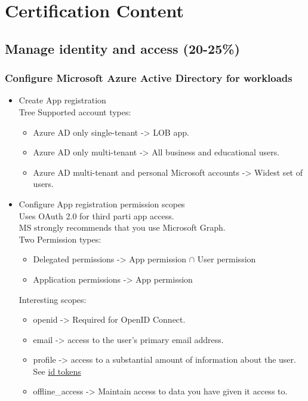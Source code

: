 \section{Certification Content}

\subsection{Manage identity and access (20-25\%)}

\subsubsection{Configure Microsoft Azure Active Directory for workloads}
\begin{itemize}
\item Create App registration \\
Tree Supported account types:
	\begin{itemize}
	\item Azure AD only single-tenant -> LOB app.
	\item Azure AD only multi-tenant -> All business and educational users.
	\item Azure AD multi-tenant and personal Microsoft accounts -> Widest set of users.
	\end{itemize}
\item Configure App registration permission scopes \\
Uses OAuth 2.0 for third parti app access.\\
MS strongly recommends that you use Microsoft Graph. \\
Two Permission types:
	\begin{itemize}
	\item Delegated permissions -> App permission $\cap$ User permission 
	\item Application permissions -> App permission  
	\end{itemize}
Interesting scopes: 
	\begin{itemize}
	\item openid -> Required for OpenID Connect.
	\item email -> access to the user's primary email address.
	\item profile -> access to a substantial amount of information about the user. See \href{https://docs.microsoft.com/en-us/azure/active-directory/develop/id-tokens}{id tokens}
	\item offline\_access -> Maintain access to data you have given it access to.

\end{itemize}
\end{itemize}
